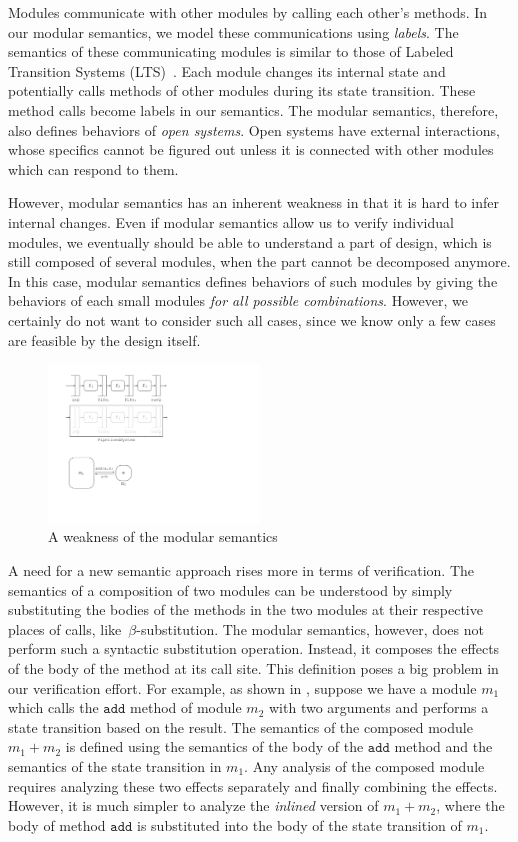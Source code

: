 Modules communicate with other modules by calling each other's
methods. In our modular semantics, we model these communications using
\emph{labels}. The semantics of these communicating modules is similar
to those of Labeled Transition Systems (LTS)~\cite{lts}. Each module
changes its internal state and potentially calls methods of other
modules during its state transition. These method calls become labels
in our semantics.  The modular semantics, therefore, also defines
behaviors of \emph{open systems}. Open systems have external
interactions, whose specifics cannot be figured out unless it is
connected with other modules which can respond to them.

However, modular semantics has an inherent weakness in that it is hard
to infer internal changes. Even if modular semantics allow us to
verify individual modules, we eventually should be able to understand
a part of design, which is still composed of several modules, when the
part cannot be decomposed anymore. In this case, modular semantics
defines behaviors of such modules by giving the behaviors of each
small modules \emph{for all possible combinations}. However, we
certainly do not want to consider such all cases, since we know only a
few cases are feasible by the design itself.

\begin{figure}[t]
  \centering
  \includegraphics[width=0.5\textwidth]{figures/modsem-weakness.pdf}
  \caption{A weakness of the modular semantics}
  \label{ex-modular-semantics-weakness}
\end{figure}

A need for a new semantic approach rises more in terms of
verification. The semantics of a composition of two modules can be
understood by simply substituting the bodies of the methods in the two
modules at their respective places of calls,
like\ $\beta$-substitution.  The modular semantics, however, does not
perform such a syntactic substitution operation. Instead, it composes
the effects of the body of the method at its call site. This
definition poses a big problem in our verification effort. For
example, as shown in , suppose
we have a module $m_1$ which calls the $\texttt{add}$ method of module
$m_2$ with two arguments and performs a state transition based on the
result. The semantics of the composed module $m_1 + m_2$ is defined
using the semantics of the body of the $\texttt{add}$ method and the
semantics of the state transition in $m_1$. Any analysis of the
composed module requires analyzing these two effects separately and
finally combining the effects. However, it is much simpler to analyze
the \emph{inlined} version of $m_1 + m_2$, where the body of method
$\texttt{add}$ is substituted into the body of the state transition of
$m_1$.

